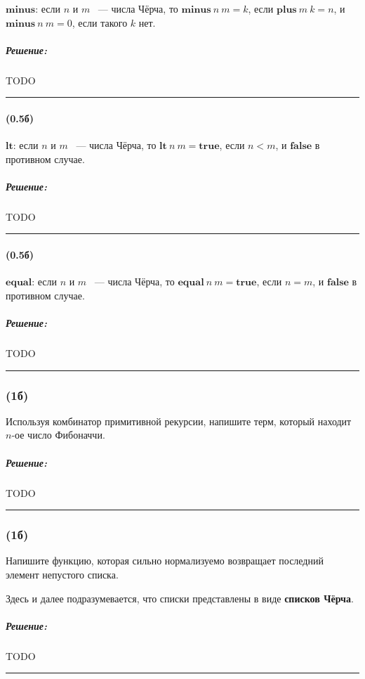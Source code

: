 \documentclass{article}
\newenvironment{proof}{\subparagraph{\hspace{-1em}Решение:\newline}}{\par\noindent\rule{\textwidth}{0.4pt}}
\newcommand{\term}[1]{\mathbf{#1}}
\begin{document}
    $\term{minus}$: если $n$ и $m$ ~--- числа Чёрча, то $\term{minus}~n~m = k$,
    если $\term{plus}~m~k = n$, и $\term{minus}~n~m = 0$, если такого $k$
    нет.

    \begin{proof}
        TODO %
    \end{proof}

    \paragraph{(0.5б)}

    $\term{lt}$: если $n$ и $m$ ~--- числа Чёрча, то $\term{lt}~n~m = \term{true}$, если $n < m$, и $\term{false}$ в противном случае.

    \begin{proof}
        TODO %
    \end{proof}

    \paragraph{(0.5б)}

    $\term{equal}$: если $n$ и $m$ ~--- числа Чёрча, то $\term{equal}~n~m = \term{true}$, если $n = m$, и $\term{false}$ в противном случае.

    \begin{proof}
        TODO %
    \end{proof}

    \subsubsection{(1б)}

    Используя комбинатор примитивной рекурсии, напишите терм, который
    находит $n$-ое число Фибоначчи.

    \begin{proof}
        TODO %
    \end{proof}

    \subsubsection{(1б)}

    Напишите функцию, которая сильно нормализуемо возвращает последний элемент непустого списка.

    Здесь и далее подразумевается, что списки представлены в виде \textbf{списков Чёрча}.

    \begin{proof}
        TODO %
    \end{proof}
\end{document}
